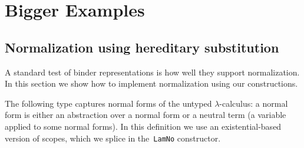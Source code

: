\documentclass[9pt,authoryear]{sigplanconf}
\begin{document}
\section{Bigger Examples\label{examples}}

\subsection{Normalization using hereditary substitution\label{hereditarySec}}

%
A standard test of binder representations is how well they support normalization. 
    In this section we show how to implement normalization using our constructions.%


%
The following type
    captures normal forms of the untyped $ \lambda $-calculus{:} a normal form is
    either an abstraction over a normal form or a neutral term (a variable applied to some normal forms). In
    this definition we use an existential-based version of scopes, which
    we splice in the{~}\texttt{LamNo} constructor.%


{\nopagebreak }
\end{document}
